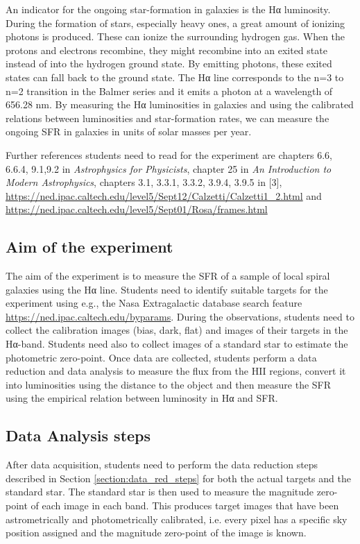 \documentclass[a4paper, 11pt, fleqn]{memoir}
\begin{document}
An indicator for the ongoing star-formation in galaxies is the Hα luminosity.
During the formation of stars, especially heavy ones, a great amount of ionizing photons is produced.
These can ionize the surrounding hydrogen gas.
When the protons and electrons recombine, they might recombine into an exited state instead of into the hydrogen ground state.
By emitting photons, these exited states can fall back to the ground state.
The Hα line corresponds to the n=3 to n=2 transition in the Balmer series and it emits a photon at a wavelength of 656.28 nm.
By measuring the Hα luminosities in galaxies and using the calibrated relations between luminosities and star-formation rates, we can measure the ongoing SFR in galaxies in units of solar masses per year.

Further references students need to read for the experiment are chapters 6.6, 6.6.4, 9.1,9.2 in \emph{Astrophysics for Physicists}\autocite{Choudhuri}, chapter 25 in \emph{An Introduction to Modern Astrophysics}\autocite{carroll2017introduction}, chapters 3.1, 3.3.1, 3.3.2, 3.9.4, 3.9.5 in [3], \url{https://ned.ipac.caltech.edu/level5/Sept12/Calzetti/Calzetti1_2.html} and \url{https://ned.ipac.caltech.edu/level5/Sept01/Rosa/frames.html}

\subsection{Aim of the experiment}

The aim of the experiment is to measure the SFR of a sample of local spiral galaxies using the Hα line.
Students need to identify suitable targets for the experiment using e.g., the Nasa Extragalactic database search feature \url{https://ned.ipac.caltech.edu/byparams}.
During the observations, students need to collect the calibration images (bias, dark, flat) and images of their targets in the Hα-band.
Students need also to collect images of a standard star to estimate the photometric zero-point.
Once data are collected, students perform a data reduction and data analysis to measure the flux from the HII regions, convert it into luminosities using the distance to the object and then measure the SFR using the empirical relation between luminosity in Hα and SFR.

\subsection{Data Analysis steps}

After data acquisition, students need to perform the data reduction steps described in Section \ref{section:data_red_steps} for both the actual targets and the standard star.
The standard star is then used to measure the magnitude zero-point of each image in each band.
This produces target images that have been astrometrically and photometrically calibrated, i.e. every pixel has a specific sky position assigned and the magnitude zero-point of the image is known.
\end{document}
